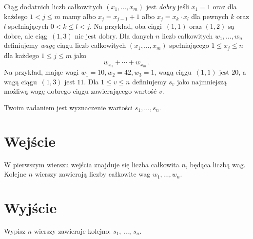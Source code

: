 
\noindent
Ciąg dodatnich liczb całkowitych $(x_1,\ldots,x_m)$ jest \emph{dobry} jeśli $x_1 = 1$ oraz dla każdego $1 < j \leq m$ mamy albo $x_j=x_{j-1}+1$ albo $x_j=x_k\cdot x_l$ dla pewnych $k$ oraz $l$ spełniających $0< k\leq l< j$.
Na przykład, oba ciągi~$(1,1)$ oraz $(1,2)$ są dobre, ale ciąg~$(1,3)$ nie jest dobry.
Dla danych $n$ liczb całkowitych $w_1,\ldots,w_n$ definiujemy 
\emph{wagę} ciągu liczb całkowitych $(x_1,\ldots,x_m)$ spełniającego $1\leq x_j \leq n$ dla każdego $1\leq j\leq m$ jako
\[ w_{x_1} +\cdots +w_{x_m}\,.\] 
Na przykład, mając wagi $w_1=10,  w_2=42,w_3= 1$, wagą ciągu~$(1,1)$ jest $20$, a wagą ciągu~$(1,3)$ jest $11$.
Dla $1\leq v\leq n$ definiujemy $s_v$ jako najmniejszą możliwą wagę dobrego ciągu zawierającego wartość $v$.

Twoim zadaniem jest wyznaczenie wartości $s_1,\ldots ,s_n$.

\section*{Wejście}

W pierwszym wierszu wejścia znajduje się liczba całkowita $n$, będąca liczbą wag.
Kolejne $n$ wierszy zawierają liczby całkowite wag $w_1, \ldots, w_n$.

\section*{Wyjście}

Wypisz $n$ wierszy zawieraje kolejno: $s_1$, $\ldots$, $s_n$.

